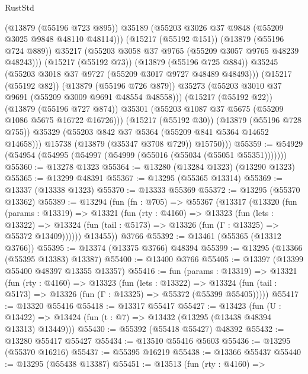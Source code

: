 \begin{lexlean}{RustStd}
\begin{coremodule}
                      (@13879 (@55196 @723 @895))
                      @35189
                      (@55203 @3026 @37 @9848 (@55209 @3025 @9848 @48110 @48114)))
                    (@15217 (@55192 @151))
                    (@13879 (@55196 @724 @889))
                    @35217
                    (@55203 @3058 @37 @9765 (@55209 @3057 @9765 @48239 @48243)))
                  (@15217 (@55192 @73))
                  (@13879 (@55196 @725 @884))
                  @35245
                  (@55203 @3018 @37 @9727 (@55209 @3017 @9727 @48489 @48493)))
                (@15217 (@55192 @82))
                (@13879 (@55196 @726 @879))
                @35273
                (@55203 @3010 @37 @9691 (@55209 @3009 @9691 @48554 @48558)))
              (@15217 (@55192 @22))
              (@13879 (@55196 @727 @874))
              @35301
              (@55203 @1087 @37 @5675 (@55209 @1086 @5675 @16722 @16726)))
            (@15217 (@55192 @30))
            (@13879 (@55196 @728 @755))
            @35329
            (@55203 @842 @37 @5364 (@55209 @841 @5364 @14652 @14658)))
          @15738
          (@13879 (@35347 @3708 @729))
          @15750)))
@55359 := @54929 (@54954 (@54995 (@54997 (@54999 (@55016 (@55034 (@55051 @55351)))))))
@55360 := @13278 @1323
@55364 := @13280 (@13284 @1323) (@13290 @1323)
@55365 := @13299 @48391
@55367 := @13295 (@55365 @13314)
@55369 := @13337 (@13338 @1323)
@55370 := @13333 @55369
@55372 := @13295 (@55370 @13362)
@55389 := @13294
    (fun (fn : @705) =>
    @55367
      (@13317
        (@13320
          (fun (params : @13319) =>
          @13321
            (fun (rty : @4160) =>
            @13323
              (fun (lets : @13322) =>
              @13324 (fun (tail : @5173) => @13326 (fun (Γ : @13325) => @55372 @13409))))))
        @13455))
    @3766
@55392 := @13461 (@55365 (@13312 @3766))
@55395 := @13374 (@13375 @3766) @48394
@55399 := @13295 (@13366 (@55395 @13383) @13387)
@55400 := @13400 @3766
@55405 := @13397 (@13399 @55400 @48397 @13355 @13357)
@55416 := fun (params : @13319) =>
  @13321
    (fun (rty : @4160) =>
    @13323
      (fun (lets : @13322) =>
      @13324 (fun (tail : @5173) => @13326 (fun (Γ : @13325) => @55372 (@55399 @55405)))))
@55417 := @13320 @55416
@55418 := @13317 @55417
@55427 := @13423
    (fun (U : @13422) => @13424 (fun (t : @7) => @13432 (@13295 (@13438 @48394 @13313) @13449)))
@55430 := @55392 (@55418 @55427) @48392
@55432 := @13280 @55417 @55427
@55434 := @13510 @55416 @5603
@55436 := @13295 (@55370 @16216)
@55437 := @55395 @16219
@55438 := @13366 @55437
@55440 := @13295 (@55438 @13387)
@55451 := @13513
    (fun (rty : @4160) =>

\end{coremodule}
\end{lexlean}
